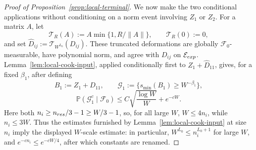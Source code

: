 \documentclass[10pt,a4paper]{amsart}
\renewcommand{\P}{\mathbb P}
\begin{document}
\begin{proof}[Proof of Proposition~\ref{prop:local-terminal}]
We now make the two conditional applications without conditioning on a
norm event involving \(Z_1\) or \(Z_2\).  For a matrix \(A\), let
\begin{equation}
 \mathcal T_R(A):=A\min\{1,R/\|A\|\},
 \qquad \mathcal T_R(0):=0,
 \label{eq:local-measurable-norm-truncation}
\end{equation}
and set \(\widehat D_{ij}:=\mathcal T_{W^{L_0}}(D_{ij})\).  These
truncated deformations are globally \(\mathcal F_0\)-measurable, have
polynomial norm, and agree with \(D_{ij}\) on
\(\mathcal E_{\rm exp}\).  Lemma~\ref{lem:local-cook-input}, applied
conditionally first to \(Z_1+\widehat D_{11}\), gives, for a fixed
\(\beta_1\), after defining
\[
 B_1:=Z_1+\widehat D_{11},
 \qquad \mathcal G_1:=\{s_{\min}(B_1)\geq W^{-\beta_1}\},
\]
\begin{equation}
 \P(\mathcal G_1^c\mid\mathcal F_0)
 \leq C\sqrt{\frac{\log W}{W}}+e^{-cW}.
 \label{eq:local-cook-one}
\end{equation}
Here both \(n_i\geq n_{\rm res}/3-1\geq W/3-1\), so, for all large
\(W\), \(W\leq4n_i\), while \(n_i\leq3W\).  Thus the estimates furnished
by Lemma~\ref{lem:local-cook-input} at size \(n_i\) imply the displayed
\(W\)-scale estimate: in particular, \(W^{L_0}\leq n_i^{L_0+1}\) for
large \(W\), and
\(e^{-cn_i}\leq e^{-cW/4}\), after which constants are renamed.


\end{proof}
\end{document}
